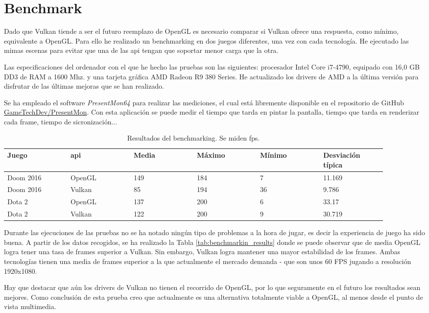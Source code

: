 \chapter{Benchmark}
Dado que Vulkan tiende a ser el futuro reemplazo de OpenGL es necesario comparar si Vulkan ofrece una respuesta, como
mínimo, equivalente a OpenGL. Para ello he realizado un benchmarking en dos juegos diferentes, una vez con cada
tecnología. He ejecutado las mimas escenas para evitar que una de las \gls{api} tengan que soportar menor carga
que la otra.

Las especificaciones del ordenador con el que he hecho las pruebas son las siguientes: procesador Intel Core i7-4790,
equipado con 16,0 GB DD3 de RAM a 1600 Mhz. y una tarjeta gráfica AMD Radeon R9 380 Series. He actualizado los drivers
de AMD a la última versión para disfrutar de las últimas mejoras que se han realizado.

Se ha empleado el software \emph{PresentMon64} para realizar las mediciones, el cual está libremente disponible en
el repositorio de GitHub \href{https://github.com/GameTechDev/PresentMon}{GameTechDev/PresentMon}. Con esta aplicación
se puede medir el tiempo que tarda en pintar la pantalla, tiempo que tarda en renderizar cada frame, tiempo de
sicronización...

\begin{table*}[t]
  \centering
  \begin{tabular}{p{0.15\linewidth}p{0.15\linewidth}p{0.15\linewidth}p{0.15\linewidth}p{0.15\linewidth}p{0.15\linewidth}}
    \toprule
    Juego & \gls{api}    & Media & Máximo & Mínimo & Desviación típica \\
    \midrule
    Doom 2016   & OpenGL  & 149 & 184 & 7   & 11.169 \\
    Doom 2016   & Vulkan  & 85  & 194 & 36  & 9.786 \\
    Dota 2      & OpenGL  & 137 & 200 & 6   & 33.17 \\
    Dota 2      & Vulkan  & 122 & 200 & 9   & 30.719 \\
    \bottomrule
  \end{tabular}
  \caption{Resultados del benchmarking. Se miden \gls{fps}.}
  \label{tab:benchmarking_results}
\end{table*}

Durante las ejecuciones de las pruebas no se ha notado ningún tipo de problemas a la hora de jugar, es decir la
experiencia de juego ha sido buena. A partir de los datos recogidos, se ha realizado la Tabla \ref{tab:benchmarkin_results}
donde se puede observar que de media OpenGL logra tener una tasa de frames superior a Vulkan. Sin embargo, Vulkan logra
mantener una mayor estabilidad de los frames. Ambas tecnologías tienen una media de frames superior a la que actualmente
el mercado demanda - que son unos 60 FPS jugando a resolución 1920x1080.

Hay que destacar que aún los drivers de Vulkan no tienen el recorrido de OpenGL, por lo que seguramente en el futuro
los resultados sean mejores. Como conclusión de esta prueba creo que actualmente es una alternativa totalmente
viable a OpenGL, al menos desde el punto de vista multimedia.
